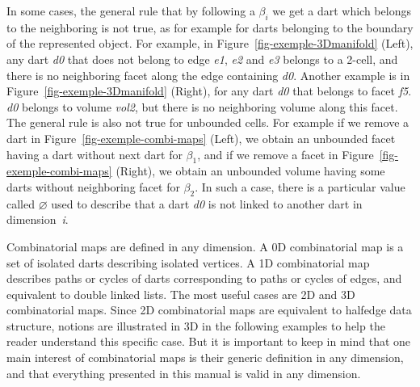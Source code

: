 In some cases, the general rule that by following a $\beta_i$ we get a
dart which belongs to the neighboring  is not true, as for example
for darts belonging to the boundary of the represented
object. For example, in Figure~\ref{fig-exemple-3Dmanifold} (Left), any dart
\emph{d0} that does not belong to edge \emph{e1}, \emph{e2} and \emph{e3}
belongs to a 2-cell, and there is no neighboring facet along the edge containing \emph{d0}.
Another example is in Figure~\ref{fig-exemple-3Dmanifold} (Right), for
any dart \emph{d0} that belongs to facet \emph{f5}.
\emph{d0} belongs to volume \emph{vol2}, but there is no neighboring volume
along this facet.  The general rule is also not true for unbounded
cells. For example if we remove a dart in
Figure~\ref{fig-exemple-combi-maps} (Left), we obtain an unbounded
facet having a dart without next dart for $\beta_1$, and if we remove
a facet in Figure~\ref{fig-exemple-combi-maps} (Right), we obtain an
unbounded volume having some darts without neighboring facet for
$\beta_2$.  In such a case, there is a particular value called
$\varnothing$ used to describe that a dart \emph{d0} is not linked to
another dart in dimension~\emph{i}.


Combinatorial maps are defined in any dimension. A 0D combinatorial
map is a set of isolated darts describing isolated vertices. A 1D
combinatorial map describes paths or cycles of darts corresponding to
paths or cycles of edges, and equivalent to double linked lists.  The
most useful cases are 2D and 3D combinatorial maps. Since 2D
combinatorial maps are equivalent to halfedge data structure, notions
are illustrated in 3D in the following examples to help the reader 
understand this specific case. But it is important to keep in mind
that one main interest of combinatorial maps is their generic
definition in any dimension, and that everything presented in this
manual is valid in any dimension.

